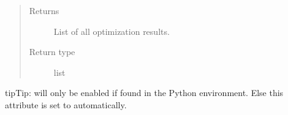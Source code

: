\documentclass[letterpaper,10pt,english]{sphinxmanual}
\begin{document}
\begin{fulllineitems}
\begin{fulllineitems}
\begin{fulllineitems}
\begin{quote}
\begin{description}
\end{description}\end{quote}

\end{fulllineitems}

\begin{quote}\begin{description}
\item[{Returns}] \leavevmode
{} \textendash{} List of all optimization results.

\item[{Return type}] \leavevmode
list

\end{description}\end{quote}

\begin{sphinxadmonition}{tip}{Tip:}
 will only be enabled if found in the Python environment. Else this attribute is set to  automatically.
\end{sphinxadmonition}

\end{fulllineitems}


\begin{fulllineitems}
\label{\detokenize{source/optimization.model:optimization.model.main.ModelOptimization.transfer_value}}
\end{fulllineitems}


\end{fulllineitems}

\end{document}
